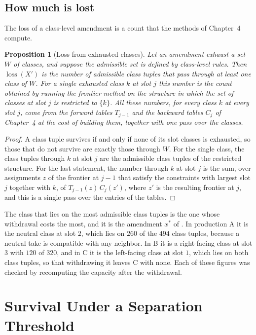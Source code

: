 \documentclass[11pt,twoside,openright]{book}
\theoremstyle{plain}
\newtheorem{proposition}[theorem]{Proposition}
\theoremstyle{definition}
\theoremstyle{remark}
\DeclareMathOperator{\loss}{loss}
\begin{document}
\subsection{How much is lost}

The loss of a class-level amendment is a count that the methods of Chapter~4 compute.

\begin{proposition}[Loss from exhausted classes]\label{prop:loss}
Let an amendment exhaust a set $W$ of classes, and suppose the admissible set is defined by class-level rules. Then $\loss(X')$ is the number of admissible class tuples that pass through at least one class of $W$. For a single exhausted class $k$ at slot $j$ this number is the count obtained by running the frontier method on the structure in which the set of classes at slot $j$ is restricted to $\{k\}$. All these numbers, for every class $k$ at every slot $j$, come from the forward tables $T_{j-1}$ and the backward tables $C_j$ of Chapter~4 at the cost of building them, together with one pass over the classes.
\end{proposition}

\begin{proof}
A class tuple survives if and only if none of its slot classes is exhausted, so those that do not survive are exactly those through $W$. For the single class, the class tuples through $k$ at slot $j$ are the admissible class tuples of the restricted structure. For the last statement, the number through $k$ at slot $j$ is the sum, over assignments $z$ of the frontier at $j-1$ that satisfy the constraints with largest slot $j$ together with $k$, of $T_{j-1}(z)\,C_j(z')$, where $z'$ is the resulting frontier at $j$, and this is a single pass over the entries of the tables.
\end{proof}

The class that lies on the most admissible class tuples is the one whose withdrawal costs the most, and it is the amendment $x^\ast$ of . In production A it is the neutral class at slot $2$, which lies on $260$ of the $494$ class tuples, because a neutral take is compatible with any neighbor. In B it is a right-facing class at slot $3$ with $120$ of $320$, and in C it is the left-facing class at slot $1$, which lies on both class tuples, so that withdrawing it leaves C with none. Each of these figures was checked by recomputing the capacity after the withdrawal.

\section{Survival Under a Separation Threshold}\label{sec:threshold}
\end{document}
